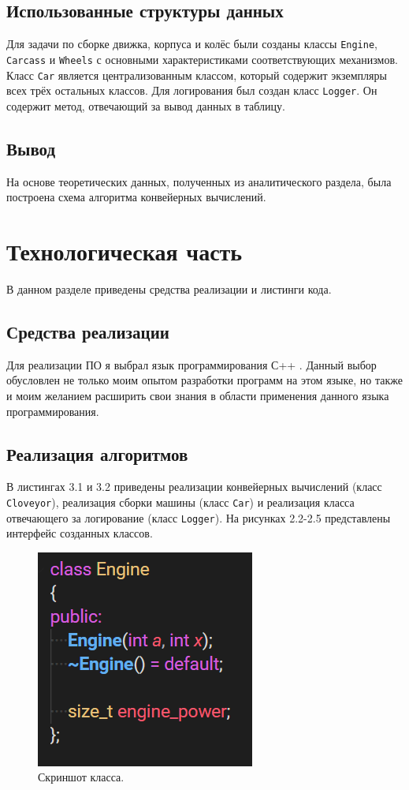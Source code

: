 \documentclass[12pt]{report}
\begin{document}
\section{Использованные структуры данных}
Для задачи по сборке движка, корпуса и колёс были созданы классы \texttt{Engine}, \texttt{Carcass} и \texttt{Wheels} с основными характеристиками соответствующих механизмов. Класс \texttt{Car} является централизованным классом, который содержит экземпляры всех трёх остальных классов. Для логирования был создан класс \texttt{Logger}.  Он содержит метод, отвечающий за вывод данных в таблицу.

\section{Вывод}
На основе теоретических данных, полученных из аналитического раздела, была построена схема алгоритма конвейерных вычислений.

\chapter{Технологическая часть}

В данном разделе приведены средства реализации и листинги кода.

\section{Средства реализации}

Для реализации ПО я выбрал язык программирования С++ \cite{C++}. Данный выбор обусловлен не только моим опытом разработки программ на этом языке, но также и моим желанием расширить свои знания в области применения данного языка программирования.

\section{Реализация алгоритмов}

В листингах 3.1 и 3.2 приведены реализации конвейерных вычислений (класс \texttt{Cloveyor}), реализация сборки машины (класс \texttt{Car}) и реализация класса отвечающего за логирование (класс \texttt{Logger}). На рисунках 2.2-2.5 представлены интерфейс созданных классов.

\begin{figure}
	\centering
	\includegraphics{Engine.PNG}
	\caption{Скриншот класса.}
	\label{fig:mpr}
\end{figure}
\end{document}

